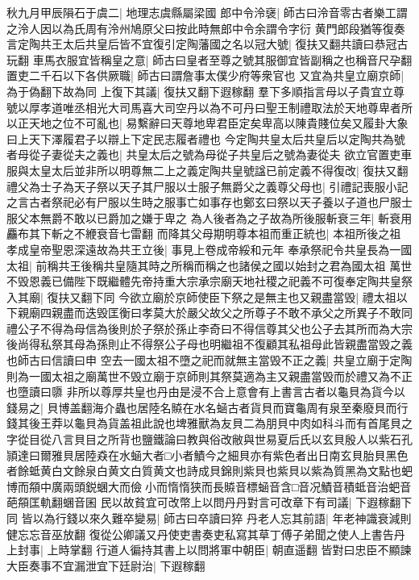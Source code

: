 秋九月甲辰隕石于虞二|{
	地理志虞縣屬梁國}
郎中令泠襃|{
	師古曰泠音零古者樂工謂之泠人因以為氏周有泠州鳩原父曰按此時無郎中令余謂令字衍}
黄門郎段猶等復奏言定陶共王太后共皇后皆不宜復引定陶藩國之名以冠大號|{
	復扶又翻共讀曰恭冠古玩翻}
車馬衣服宜皆稱皇之意|{
	師古曰皇者至尊之號其服御宜皆副稱之也稱音尺孕翻}
置吏二千石以下各供厥職|{
	師古曰謂詹事太僕少府等衆官也}
又宜為共皇立廟京師|{
	為于偽翻下故為同}
上復下其議|{
	復扶又翻下遐稼翻}
羣下多順指言母以子貴宜立尊號以厚孝道唯丞相光大司馬喜大司空丹以為不可丹曰聖王制禮取法於天地尊卑者所以正天地之位不可亂也|{
	易繫辭曰天尊地卑君臣定矣卑高以陳貴賤位矣又履卦大象曰上天下澤履君子以辯上下定民志履者禮也}
今定陶共皇太后共皇后以定陶共為號者母從子妻從夫之義也|{
	共皇太后之號為母從子共皇后之號為妻從夫}
欲立官置吏車服與太皇太后並非所以明尊無二上之義定陶共皇號諡已前定義不得復改|{
	復扶又翻}
禮父為士子為天子祭以天子其尸服以士服子無爵父之義尊父母也|{
	引禮記喪服小記之言古者祭祀必有尸服以生時之服事亡如事存也鄭玄曰祭以天子養以子道也尸服士服父本無爵不敢以已爵加之嫌于卑之}
為人後者為之子故為所後服斬衰三年|{
	斬衰用麤布其下斬之不緶衰音七雷翻}
而降其父母期明尊本祖而重正統也|{
	本祖所後之祖}
孝成皇帝聖恩深遠故為共王立後|{
	事見上卷成帝綏和元年}
奉承祭祀令共皇長為一國太祖|{
	前稱共王後稱共皇隨其時之所稱而稱之也諸侯之國以始封之君為國太祖}
萬世不毁恩義已備陛下既繼體先帝持重大宗承宗廟天地社稷之祀義不可復奉定陶共皇祭入其廟|{
	復扶又翻下同}
今欲立廟於京師使臣下祭之是無主也又親盡當毁|{
	禮太祖以下親廟四親盡而迭毁匡衡曰孝莫大於嚴父故父之所尊子不敢不承父之所異子不敢同禮公子不得為母信為後則於子祭於孫止李奇曰不得信尊其父也公子去其所而為大宗後尚得私祭其母為孫則止不得祭公子母也明繼祖不復顧其私祖母此皆親盡當毁之義也師古曰信讀曰申}
空去一國太祖不墮之祀而就無主當毁不正之義|{
	共皇立廟于定陶則為一國太祖之廟萬世不毁立廟于京師則其祭莫適為主又親盡當毁而於禮又為不正也墮讀曰隳}
非所以尊厚共皇也丹由是浸不合上意會有上書言古者以龜貝為貨今以錢易之|{
	貝博盖翻海介蟲也居陸名贆在水名蜬古者貨貝而寶龜周有泉至秦廢貝而行錢其後王莽以龜貝為貨盖祖此說也埤雅獸為友貝二為朋貝中肉如科斗而有首尾貝之字從目從八言貝目之所背也鹽鐵論曰教與俗改敝與世易夏后氏以玄貝殷人以紫石孔頴達曰爾雅貝居陸猋在水蜬大者□小者鰿今之細貝亦有紫色者出日南玄貝胎貝黑色者餘蚳黄白文餘泉白黄文白質黄文也詩成貝錦則紫貝也紫貝以紫為質黑為文點也蚆博而頯中廣兩頭鋭蜠大而儉小而惰惰狭而長贆音標蜬音含□音况鰿音積蚳音治蚆音葩頯匡軌翻蜠音囷}
民以故貧宜可改幣上以問丹丹對言可改章下有司議|{
	下遐稼翻下同}
皆以為行錢以來久難卒變易|{
	師古曰卒讀曰猝}
丹老人忘其前語|{
	年老神識衰減則健忘忘音巫放翻}
復從公卿議又丹使吏書奏吏私寫其草丁傅子弟聞之使人上書告丹上封事|{
	上時掌翻}
行道人徧持其書上以問將軍中朝臣|{
	朝直遥翻}
皆對曰忠臣不顯諫大臣奏事不宜漏泄宜下廷尉治|{
	下遐稼翻}
